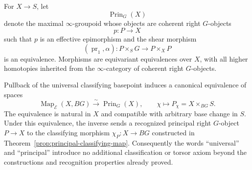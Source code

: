 \begin{definition}
\label{def:principal-object-space}
For $X\to S$, let
\[
    \operatorname{Prin}_G(X)
\]
denote the maximal $\infty$-groupoid whose objects are coherent right
$G$-objects
\[
    p:P\longrightarrow X
\]
such that $p$ is an effective epimorphism and the shear morphism
\[
    (\operatorname{pr}_1,\alpha):
    P\times_SG
    \longrightarrow
    P\times_XP
\]
is an equivalence.  Morphisms are equivariant equivalences over $X$, with
all higher homotopies inherited from the $\infty$-category of coherent right
$G$-objects.
\end{definition}

\begin{theorem}
\label{thm:principal-objects-classified-by-bg}
Pullback of the universal classifying basepoint induces a canonical
equivalence of spaces
\[
\boxed{
    \operatorname{Map}_{\mathcal E}(X,BG)
    \xrightarrow{\sim}
    \operatorname{Prin}_G(X),
    \qquad
    \chi\longmapsto
    P_\chi=X\times_{BG}S.
}
\]
The equivalence is natural in $X$ and compatible with arbitrary base change
in $S$.  Under this equivalence, the inverse sends a recognized principal
right $G$-object $P\to X$ to the classifying morphism
$\chi_P:X\to BG$ constructed in
Theorem~\ref{prop:principal-classifying-map}.  Consequently the words
``universal'' and ``principal'' introduce no additional classification or
torsor axiom beyond the constructions and recognition properties already
proved.
\end{theorem}

